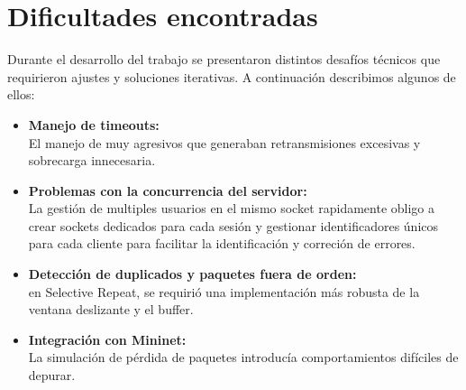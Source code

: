 \section{Dificultades encontradas}
Durante el desarrollo del trabajo se presentaron distintos desafíos técnicos que requirieron ajustes y soluciones iterativas. A continuación describimos algunos de ellos:

\begin{itemize}
    \item \textbf{Manejo de timeouts:}\\
    El manejo de muy agresivos que generaban retransmisiones excesivas y sobrecarga innecesaria.
    \item \textbf{Problemas con la concurrencia del servidor:}\\ La gestión de multiples usuarios en el mismo socket rapidamente obligo a crear sockets dedicados para cada sesión y gestionar identificadores únicos para cada cliente para facilitar la identificación y correción de errores.
    \item \textbf{Detección de duplicados y paquetes fuera de orden:}\\
    en Selective Repeat, se requirió una implementación más robusta de la ventana deslizante y el buffer.
    \item \textbf{Integración con Mininet:}\\ 
    La simulación de pérdida de paquetes introducía comportamientos difíciles de depurar.
\end{itemize}






